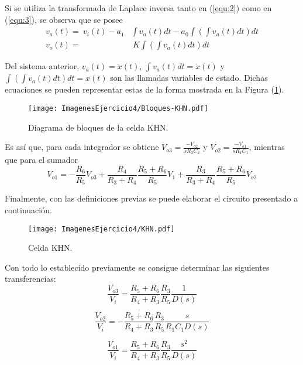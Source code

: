 Si se utiliza la transformada de Laplace inversa tanto en (\ref{equ:2}) como en (\ref{equ:3}), se observa que se posee
\begin{equation}
\begin{split}
	v_a(t) =\ v_i(t) - a_1 & \int v_a(t)dt - a_0 \int \left( \int v_a(t)dt \right) dt \\
	v_o(t) =& \ K\int \left( \int v_a(t)dt \right) dt
\end{split}
\end{equation}

Del sistema anterior, $v_a(t) = \ddot{x}(t) $, $\int v_a(t)dt = \dot{x}(t)$ y $\int \left( \int v_a(t)dt \right) dt = x(t)$ son las llamadas variables de estado. Dichas ecuaciones se pueden representar estas de la forma mostrada en la Figura (\ref{fig:blockKHN}).
\begin{figure}[H]
\centering
	\texttt{[image: ImagenesEjercicio4/Bloques-KHN.pdf]}
	\caption{Diagrama de bloques de la celda KHN.}
	\label{fig:blockKHN}
\end{figure}

Es así que, para cada integrador se obtiene $V_{o3} = \frac{-V_{o2}}{sR_2C_2}$ y
$V_{o2} = \frac{-V_{o1}}{sR_1C_1}$, mientras que para el sumador
\begin{equation*}
	V_{o1} = -\frac{R_6}{R_5} V_{o3} + \frac{R_4}{R_3 + R_4} \frac{R_5 + R_6}{R_5} V_1 + \frac{R_3}{R_3 + R_4} \frac{R_5 + R_6}{R_5} V_{o2}
\end{equation*}

Finalmente, con las definiciones previas se puede elaborar el circuito presentado a continuación.
\begin{figure}[H]
\centering
	\texttt{[image: ImagenesEjercicio4/KHN.pdf]}
	\caption{Celda KHN.}
	\label{fig:KHN}
\end{figure}

Con todo lo establecido previamente se consigue determinar las siguientes transferencias:
\begin{equation}
	\frac{V_{o3}}{V_{i}} = \frac{R_5 + R_6}{R_4 + R_3} \frac{R_3}{R_5} \frac{1}{D(s)}
	\label{equ:pbajo}
\end{equation}

\begin{equation}
	\frac{V_{o2}}{V_{i}} = -\frac{R_5 + R_6}{R_4 + R_3} \frac{R_3}{R_5} \frac{s}{R_1 C_1 D(s)}
	\label{equ:pband}
\end{equation}

\begin{equation}
	\frac{V_{o1}}{V_{i}} = \frac{R_5 + R_6}{R_4 + R_3} \frac{R_3}{R_5} \frac{s^2}{D(s)}
	\label{equ:palto}
\end{equation}

